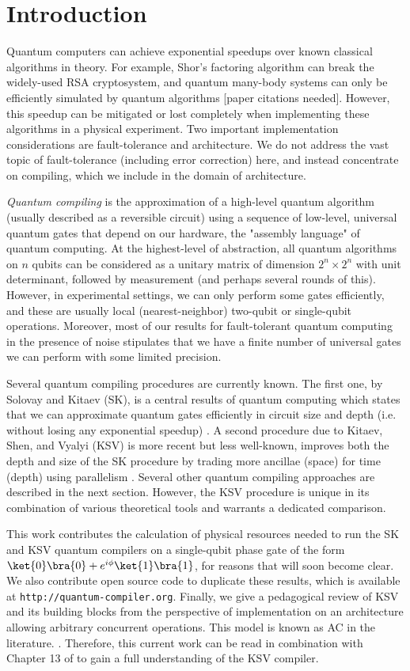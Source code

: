 \section{Introduction}

Quantum computers can achieve exponential speedups over known classical
algorithms in theory. For example, Shor's factoring algorithm can break the
widely-used RSA cryptosystem, and quantum many-body systems can only be
efficiently simulated by quantum algorithms [paper citations needed].
However, this speedup can be mitigated or lost completely when implementing
these algorithms in a physical experiment.
Two important implementation considerations 
are fault-tolerance and architecture. We do not address the vast topic
of fault-tolerance (including error correction) here, and instead
concentrate on compiling, which we include in the domain of architecture.

\emph{Quantum compiling} is the
approximation of a high-level quantum algorithm (usually described as a
reversible circuit) using a sequence
of low-level, universal quantum gates that depend on our hardware, the
"assembly language" of quantum computing.
At the highest-level of abstraction, all quantum algorithms on $n$ qubits
can be considered as a unitary matrix of dimension $2^n \times 2^n$ with
unit determinant, followed by measurement (and perhaps several rounds of this).
However, in experimental settings,
we can only perform some gates efficiently, and these are usually local
(nearest-neighbor) two-qubit or single-qubit operations.
Moreover, most of our results for fault-tolerant
quantum computing in the presence of noise stipulates that we have a finite
number of universal gates we can perform with some limited precision.

Several quantum compiling procedures are currently known. The first one,
by Solovay and Kitaev (SK),
is a central results of quantum computing which states that we
can approximate quantum gates efficiently in circuit size and
depth (i.e. without losing any exponential speedup) \cite{Dawson2005}.
A second procedure due to Kitaev, Shen, and Vyalyi (KSV) is more recent but
less well-known, improves
both the depth and size of the SK procedure by trading
more ancillae (space) for time (depth) using parallelism
\cite{ksv02}. Several other quantum compiling approaches are described
in the next section. However, the KSV procedure is unique in its combination of
various theoretical tools and warrants a dedicated comparison.

This work contributes the calculation of physical resources needed
to run the SK and KSV quantum compilers on a single-qubit phase gate
of the form $\ket{0}\bra{0} + e^{i\phi}\ket{1}\bra{1}$, for reasons that
will soon become clear. We also contribute open source code to duplicate
these results, which is available at \texttt{http://quantum-compiler.org}.
Finally, we give a pedagogical review of KSV and its building blocks from the
perspective of implementation on an architecture allowing arbitrary concurrent
operations. This model is known as \textsc{AC} in the literature.
\cite{VanMeter2008}. Therefore, this current work can be read in combination
with Chapter 13 of \cite{ksv02} to gain a full understanding of the KSV
compiler.

